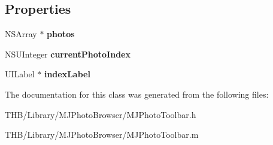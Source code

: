 \subsection*{Properties}
\begin{DoxyCompactItemize}
\item 
\mbox{\label{interface_m_j_photo_toolbar_a0dbcab8a91ceb376b05f9a56025010f3}} 
N\+S\+Array $\ast$ {\bfseries photos}
\item 
\mbox{\label{interface_m_j_photo_toolbar_a974df5496cb90ff7583976d8535538f1}} 
N\+S\+U\+Integer {\bfseries current\+Photo\+Index}
\item 
\mbox{\label{interface_m_j_photo_toolbar_a82b7e63c984fa2f95401442cfdb953dc}} 
U\+I\+Label $\ast$ {\bfseries index\+Label}
\end{DoxyCompactItemize}


The documentation for this class was generated from the following files\+:\begin{DoxyCompactItemize}
\item 
T\+H\+B/\+Library/\+M\+J\+Photo\+Browser/M\+J\+Photo\+Toolbar.\+h\item 
T\+H\+B/\+Library/\+M\+J\+Photo\+Browser/M\+J\+Photo\+Toolbar.\+m\end{DoxyCompactItemize}
